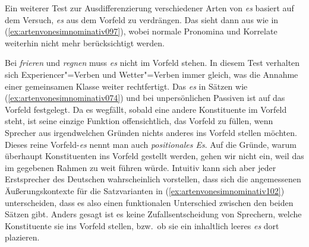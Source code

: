 Ein weiterer Test zur Ausdifferenzierung verschiedener Arten von \textit{es} basiert auf dem Versuch, \textit{es} aus dem Vorfeld zu verdrängen.
Das sieht dann aus wie in (\ref{ex:artenvonesimnominativ097}), wobei normale Pronomina und Korrelate weiterhin nicht mehr berücksichtigt werden.


\begin{exe}
  \ex\label{ex:artenvonesimnominativ097}
  \begin{xlist}
  \end{xlist}
\end{exe}


Bei \textit{frieren} und \textit{regnen} muss \textit{es} nicht im Vorfeld stehen.
In diesem Test verhalten sich Experiencer"=Verben und Wetter"=Verben immer gleich, was die Annahme einer gemeinsamen Klasse weiter rechtfertigt.
Das \textit{es} in Sätzen wie (\ref{ex:artenvonesimnominativ074}) und bei unpersönlichen Passiven ist auf das Vorfeld festgelegt.
Da es wegfällt, sobald eine andere Konstituente im Vorfeld steht, ist seine einzige Funktion offensichtlich, das Vorfeld zu füllen, wenn Sprecher aus irgendwelchen Gründen nichts anderes ins Vorfeld stellen möchten.
Dieses reine Vorfeld-\textit{es} nennt man auch \textit{positionales Es}.
Auf die Gründe, warum überhaupt Konstituenten ins Vorfeld gestellt werden, gehen wir nicht ein, weil das im gegebenen Rahmen zu weit führen würde.
Intuitiv kann sich aber jeder Erstsprecher des Deutschen wahrscheinlich vorstellen, dass sich die angemessenen Äußerungskontexte für die Satzvarianten in (\ref{ex:artenvonesimnominativ102}) unterscheiden, dass es also einen funktionalen Unterschied zwischen den beiden Sätzen gibt.
Anders gesagt ist es keine Zufallsentscheidung von Sprechern, welche Konstituente sie ins Vorfeld stellen, bzw.\ ob sie ein inhaltlich leeres \textit{es} dort plazieren.


\begin{exe}
  \ex\label{ex:artenvonesimnominativ102}
  \begin{xlist}
  \end{xlist}
\end{exe}


